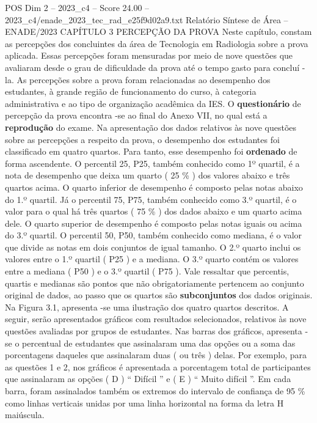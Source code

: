 \begin{textsample}{POS Dim 2 – 2023\_c4 – Score 24.00 – 2023\_c4/enade\_2023\_tec\_rad\_e25f9d02a9.txt}  \label{ex:f2_pos_016}
Relatório Síntese de Área – ENADE/2023 CAPÍTULO 3 PERCEPÇÃO DA PROVA Neste capítulo, constam as percepções dos concluintes da área de Tecnologia em Radiologia sobre a prova aplicada.
Essas percepções foram mensuradas por meio de nove questões que avaliaram desde o grau de dificuldade da prova até o tempo gasto para concluí -la.
As percepções sobre a prova foram relacionadas ao desempenho dos estudantes, à grande região de funcionamento do curso, à categoria administrativa e ao tipo de organização acadêmica da IES.
O \textbf{questionário} de percepção da prova encontra -se ao final do Anexo VII, no qual está a \textbf{reprodução} do exame.
Na apresentação dos dados relativos às nove questões sobre as percepções a respeito da prova, o desempenho dos estudantes foi classificado em quatro quartos.
Para tanto, esse desempenho foi \textbf{ordenado} de forma ascendente.
O percentil 25, P25, também conhecido como 1º quartil, é a nota de desempenho que deixa um quarto ( 25 \% ) dos valores abaixo e três quartos acima.
O quarto inferior de desempenho é composto pelas notas abaixo do 1.º quartil.
Já o percentil 75, P75, também conhecido como 3.º quartil, é o valor para o qual há três quartos ( 75 \% ) dos dados abaixo e um quarto acima dele.
O quarto superior de desempenho é composto pelas notas iguais ou acima do 3.º quartil.
O percentil 50, P50, também conhecido como mediana, é o valor que divide as notas em dois conjuntos de igual tamanho.
O 2.º quarto inclui os valores entre o 1.º quartil ( P25 ) e a mediana.
O 3.º quarto contém os valores entre a mediana ( P50 ) e o 3.º quartil ( P75 ).
Vale ressaltar que percentis, quartis e medianas são pontos que não obrigatoriamente pertencem ao conjunto original de dados, ao passo que os quartos são \textbf{subconjuntos} dos dados originais.
Na Figura 3.1, apresenta -se uma ilustração dos quatro quartos descritos.
A seguir, serão apresentados gráficos com resultados selecionados, relativos às nove questões avaliadas por grupos de estudantes.
Nas barras dos gráficos, apresenta -se o percentual de estudantes que assinalaram uma das opções ou a soma das porcentagens daqueles que assinalaram duas ( ou três ) delas.
Por exemplo, para as questões 1 e 2, nos gráficos é apresentada a porcentagem total de participantes que assinalaram as opções ( D ) “ Difícil ” e ( E ) “ Muito difícil ”.
Em cada barra, foram assinalados também os extremos do intervalo de confiança de 95 \% como linhas verticais unidas por uma linha horizontal na forma da letra H maiúscula.

\end{textsample}
